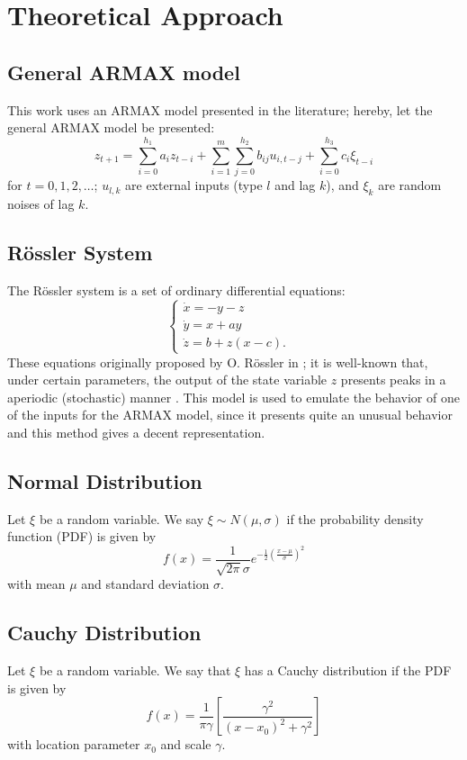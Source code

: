 \section{Theoretical Approach}\label{sec:theo}
\subsection{General ARMAX model}
This work uses an ARMAX model presented in the literature; hereby, let the general ARMAX model be presented:
\begin{equation}
    z_{t+1}=\sum_{i=0}^{h_1}a_iz_{t-i}+\sum_{i=1}^{m}\sum_{j=0}^{h_2}b_{ij}u_{i,t-j}+\sum_{i=0}^{h_3}c_i\xi_{t-i}
\end{equation}
for $t=0,1,2,\ldots$; $u_{l,k}$ are external inputs (type $l$ and lag $k$), and $\xi_k$ are random noises of lag $k$.

\subsection{R\"ossler System}
The R\"ossler system is a set of ordinary differential equations:
\begin{equation}
  \begin{cases}
    \dot{x}=-y-z&\\
    \dot{y}=x+ay&\\
    \dot{z}=b+z(x-c).&
  \end{cases}
\end{equation}
These equations originally proposed by O. R\"ossler in \cite{rossler1976equation}; it is well-known that, under certain parameters, the output of the state variable $z$ presents peaks in a aperiodic (stochastic) manner \cite{canals2014random}. This model is used to emulate the behavior of one of the inputs for the ARMAX model, since it presents quite an unusual behavior and this method gives a decent representation.

\subsection{Normal Distribution}
Let $\xi$ be a random variable. We say $\xi\sim N(\mu,\sigma)$ if the probability density function (PDF) is given by
\begin{equation}
  f(x)=\dfrac{1}{\sqrt{2\pi}\sigma}e^{-\frac{1}{2}\left(\frac{x-\mu}{\sigma}\right)^2}
\end{equation}
with mean $\mu$ and standard deviation $\sigma$.

\subsection{Cauchy Distribution}
Let $\xi$ be a random variable. We say that $\xi$ has a Cauchy distribution if the PDF is given by
\begin{equation}
  f(x)=\dfrac{1}{\pi \gamma}\left[\dfrac{\gamma^{2}}{\left(x-x_{0}\right)^{2}+\gamma^{2}}\right]
\end{equation}
with location parameter $x_0$ and scale $\gamma$.

